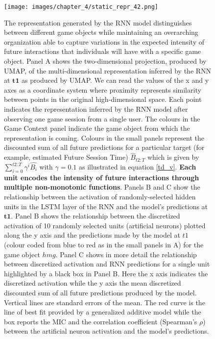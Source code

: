 \begin{figure}[ht]
\centering
\texttt{[image: images/chapter\_4/static\_repr\_42.png]}
\caption[\textbf{Lower dimensional representation of the latent state generated by the RNN architecture}]{The representation generated by the RNN model distinguishes between different game objects while maintaining an overarching organization able to capture variations in the expected intensity of future interactions that individuals will have with a specific game object. Panel A shows the two-dimensional projection, produced by UMAP, of the multi-dimensional representation inferred by the RNN at $\mathbf{t1}$ as produced by UMAP. We can read the values of the x and y axes as a coordinate system where proximity represents similarity between points in the original high-dimensional space. Each point indicates the representation inferred by the RNN model after observing one game session from a single user. The colours in the Game Context panel indicate the game object from which the representation is coming. Colours in the small panels represent the discounted sum of all future predictions for a particular target (for example, estimated Future Session Time) $\widehat{B}_{t2:T}$ which is given by $\sum_{i=0}^{t2:T} \gamma^i\widehat{B_i}$ with $\gamma=0.1$ as illustrated in equation \ref{td_v}. \textbf{Each unit  encodes the intensity of future interactions through multiple non-monotonic functions}. Panels B and C show the relationship between the activation of randomly-selected hidden units in the LSTM layer of the RNN and the model's predictions at $\mathbf{t1}$. Panel B shows the relationship between the discretized activation of 10 randomly selected units (artificial neurons) plotted along the y axis and the predictions made by the model at $t1$ (colour coded from blue to red as in the small panels in A) for the game object $hmg$. Panel C shows in more detail the relationship between discretized activation and RNN predictions for a single unit highlighted by a black box in Panel B. Here the x axis indicates the discretized activation while the y axis the mean discretized discounted sum of all future predictions produced by the model. Vertical lines are standard errors of the mean. The red curve is the line of best fit provided by a generalized additive model \cite{serven2018} while the box reports the MIC and the correlation coefficient (Spearman's $\rho$) between the artificial neuron activation and the model's predictions.}
\label{full_panel_static}
\end{figure}
